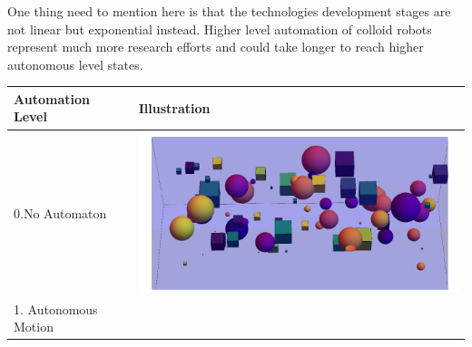 One thing need to mention here is that the technologies development stages are not linear but exponential instead. Higher level automation of colloid robots  represent much more research efforts and could take longer to reach higher autonomous level states.

\begin{table}[h!]
  \centering
  \begin{tabular}{ | m{6cm} | m{6cm} | }
    \hline
    Automation Level & Illustration \\ \hline
     0.No Automaton
      &
      \begin{minipage}{.35\textwidth}
      \includegraphics[width=\linewidth]{figures/table1_1.pdf}
    \end{minipage}
    \\  \hline
      1. Autonomous Motion
  

\end{tabular}
\end{table}
